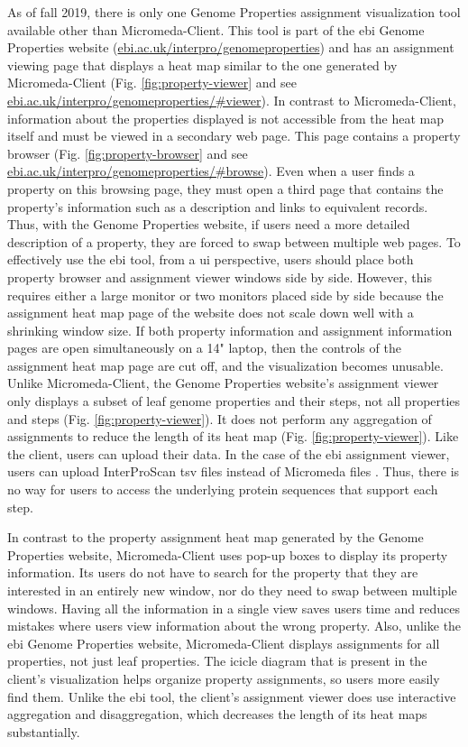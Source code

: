 As of fall 2019, there is only one Genome Properties assignment visualization tool available other than Micromeda-Client. This tool is part of the \gls{ebi}  Genome Properties website \cite{richardson2018genome} (\href{ebi.ac.uk/interpro/genomeproperties}{ebi.ac.uk/interpro/genomeproperties}) and has an assignment viewing page that displays a heat map similar to the one generated by Micromeda-Client \cite{richardson2018genome}  (Fig. \ref{fig:property-viewer} and see \href{ebi.ac.uk/interpro/genomeproperties/\#viewer}{ebi.ac.uk/interpro/genomeproperties/\#viewer}). In contrast to Micromeda-Client, information about the properties displayed is not accessible from the heat map itself and must be viewed in a secondary web page. This page contains a property browser (Fig. \ref{fig:property-browser} and see \href{ebi.ac.uk/interpro/genomeproperties/\#browse}{ebi.ac.uk/interpro/genomeproperties/\#browse}). Even when a user finds a property on this browsing page, they must open a third page that contains the property's information such as a description and links to equivalent records. Thus, with the Genome Properties website, if users need a more detailed description of a property, they are forced to swap between multiple web pages. To effectively use the \gls{ebi}  tool, from a \gls{ui}  perspective, users should place both property browser and assignment viewer windows side by side. However, this requires either a large monitor or two monitors placed side by side because the assignment heat map page of the website does not scale down well with a shrinking window size. If both property information and assignment information pages are open simultaneously on a 14" laptop, then the controls of the assignment heat map page are cut off, and the visualization becomes unusable. Unlike Micromeda-Client, the Genome Properties website's assignment viewer only displays a subset of leaf genome properties and their steps, not all properties and steps (Fig. \ref{fig:property-viewer}). It does not perform any aggregation of assignments to reduce the length of its heat map (Fig. \ref{fig:property-viewer}). Like the client, users can upload their data. In the case of the \gls{ebi}  assignment viewer, users can upload InterProScan \gls{tsv} files instead of Micromeda files \cite{richardson2018genome}. Thus, there is no way for users to access the underlying protein sequences that support each step.

In contrast to the property assignment heat map generated by the Genome Properties website, Micromeda-Client uses pop-up boxes to display its property information. Its users do not have to search for the property that they are interested in an entirely new window, nor do they need to swap between multiple windows. Having all the information in a single view saves users time and reduces mistakes where users view information about the wrong property. Also, unlike the \gls{ebi}  Genome Properties website, Micromeda-Client displays assignments for all properties, not just leaf properties. The icicle diagram that is present in the client's visualization helps organize property assignments, so users more easily find them. Unlike the \gls{ebi}  tool, the client's assignment viewer does use interactive aggregation and disaggregation, which decreases the length of its heat maps substantially.

